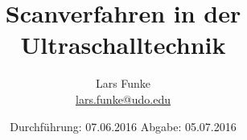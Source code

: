
\author{
  Lars Funke
  \texorpdfstring{
    \\
    \href{mailto:lars.funke@udo.edu}{lars.funke@udo.edu}
  }{}%
}
\subject{US2}
\title{Scanverfahren in der Ultraschalltechnik}
\date{
  Durchführung: 07.06.2016
  \hspace{3em}
  Abgabe: 05.07.2016
}



\maketitle
\newpage
\mbox{}
\newpage
\thispagestyle{empty}






\printbibliography


